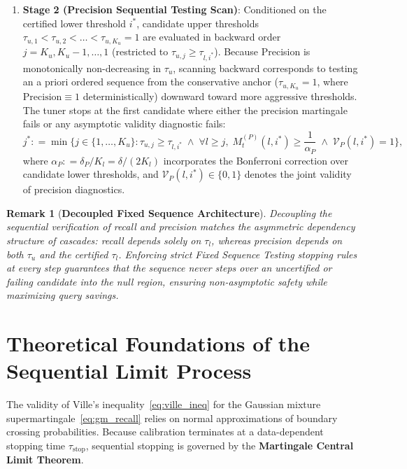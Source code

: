 \documentclass[11pt,a4paper]{article}
\newcommand{\coloneqq}{\mathrel{\mathop:}=}
\newtheorem{remark}{Remark}
\begin{document}
\begin{enumerate}[leftmargin=*]
    \item \textbf{Stage 2 (Precision Sequential Testing Scan)}:
    Conditioned on the certified lower threshold $i^*$, candidate upper thresholds $\tau_{u, 1} < \tau_{u, 2} < \dots < \tau_{u, K_u} = 1$ are evaluated in backward order $j = K_u, K_u-1, \dots, 1$ (restricted to $\tau_{u, j} \ge \tau_{l, i^*}$). Because Precision is monotonically non-decreasing in $\tau_u$, scanning backward corresponds to testing an a priori ordered sequence from the conservative anchor ($\tau_{u, K_u} = 1$, where $\text{Precision} \equiv 1$ deterministically) downward toward more aggressive thresholds. The tuner stops at the first candidate where either the precision martingale fails or any asymptotic validity diagnostic fails:
    \begin{equation}\label{eq:fst_precision}
    j^* \coloneqq \min \Big\{ j \in \{1, \dots, K_u\} : \tau_{u, j} \ge \tau_{l, i^*} \;\land\; \forall l \ge j, \; M_t^{(P)}(l, i^*) \ge \frac{1}{\alpha_P} \;\land\; \mathcal{V}_P(l, i^*) = 1 \Big\},
    \end{equation}
    where $\alpha_P \coloneqq \delta_P / K_l = \delta / (2 K_l)$ incorporates the Bonferroni correction over candidate lower thresholds, and $\mathcal{V}_P(l, i^*) \in \{0, 1\}$ denotes the joint validity of precision diagnostics.
\end{enumerate}

\begin{remark}[\textbf{Decoupled Fixed Sequence Architecture}]\label{rem:decoupled_diag}
Decoupling the sequential verification of recall and precision matches the asymmetric dependency structure of cascades: recall depends solely on $\tau_l$, whereas precision depends on both $\tau_u$ and the certified $\tau_l$. Enforcing strict Fixed Sequence Testing stopping rules at every step guarantees that the sequence never steps over an uncertified or failing candidate into the null region, ensuring non-asymptotic safety while maximizing query savings.
\end{remark}

\newpage
\section{Theoretical Foundations of the Sequential Limit Process}\label{sec:clt_theory}

The validity of Ville's inequality~\eqref{eq:ville_ineq} for the Gaussian mixture supermartingale~\eqref{eq:gm_recall} relies on normal approximations of boundary crossing probabilities. Because calibration terminates at a data-dependent stopping time $\tau_{\text{stop}}$, sequential stopping is governed by the \textbf{Martingale Central Limit Theorem}.
\end{document}
